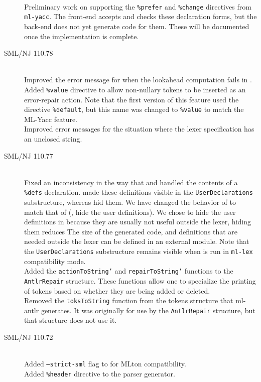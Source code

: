 \begin{description}
    \\[0.5em]
    Preliminary work on supporting the \texttt{\%prefer} and \texttt{\%change} directives
    from \texttt{ml-yacc}.  The front-end accepts and checks these declaration forms, but
    the back-end does not yet generate code for them.  These will be documented once the
    implementation is complete.
%
  \item[SML/NJ 110.78]
    \mbox{}\\[0.5em]
    Improved the error message for when the lookahead computation fails in \mlantlr{}.
    \\[0.5em]
    Added \texttt{\%value} directive to allow non-nullary tokens to be inserted as
    an error-repair action.
    Note that the first version of this feature used the directive \texttt{\%default}, but
    this name was changed to \texttt{\%value} to match the ML-Yacc feature.
    \\[0.5em]
    Improved error messages for the situation where the lexer specification has an unclosed string.
%
  \item[SML/NJ 110.77]
    \mbox{}\\[0.5em]
    Fixed an inconsistency in the way that \mlantlr{} and \ulex{} handled the contents of
    a \texttt{\%defs} declaration.  \ulex{} made these definitions visible in the \texttt{UserDeclarations}
    substructure, whereas \mlantlr{} hid them.  We have changed the behavior of \ulex{} to match
    that of \mlantlr{} (\ie{}, hide the user definitions).  We chose to hide the user definitions
    in \ulex{} because they are usually not useful outside the lexer, hiding them reduces The
    size of the generated code, and definitions that are needed outside the lexer can be
    defined in an external module.  Note that the \texttt{UserDeclarations} substructure remains
    visible when \ulex{} is run in \texttt{ml-lex} compatibility mode.
    \\[0.5em]
    Added the \texttt{actionToString'} and \texttt{repairToString'} functions
    to the \texttt{AntlrRepair} structure.  These functions allow one to
    specialize the printing of tokens based on whether they are being added or deleted.
    \\[0.5em]
    Removed the \texttt{toksToString} function from the tokens structure that ml-antlr
    generates.  It was originally for use by the \texttt{AntlrRepair} structure, but that
    structure does not use it.
%
  \item[SML/NJ 110.72]
    \mbox{}\\[0.5em]
    Added \texttt{--strict-sml} flag to \ulex{} for MLton compatibility.
    \\[0.5em]
    Added \texttt{\%header} directive to the \mlantlr{} parser generator.
\end{description}%
